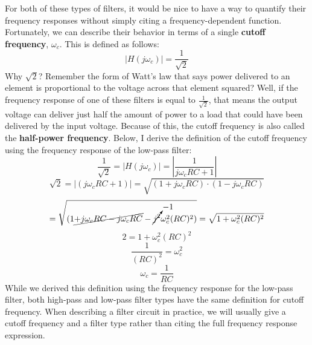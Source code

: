 \par
For both of these types of filters, it would be nice to have a way to quantify their frequency responses without simply citing a frequency-dependent function. Fortunately, we can describe their behavior in terms of a single \textbf{cutoff frequency}, $\omega_c$. This is defined as follows:
$$
|H(j\omega_c)| = \frac{1}{\sqrt{2}}
$$
Why $\sqrt{2}$? Remember the form of Watt's law that says power delivered to an element is proportional to the voltage across that element squared? Well, if the frequency response of one of these filters is equal to $\frac{1}{\sqrt{2}}$, that means the output voltage can deliver just half the amount of power to a load that could have been delivered by the input voltage. Because of this, the cutoff frequency is also called the \textbf{half-power frequency}. Below, I derive the definition of the cutoff frequency using the frequency response of the low-pass filter:
$$
\frac{1}{\sqrt{2}} = |H(j\omega_c)| = \left|\frac{1}{j\omega_c RC +1}\right|
$$
$$
\sqrt{2} = |(j\omega_c RC +1)| = \sqrt{(1 + j\omega_c RC)\cdot(1 - j\omega_c RC)}
$$
$$
= \sqrt{(1 \cancel{+ j\omega_c RC - j\omega_c RC} - \cancelto{-1}{j^2}\omega_c^2(RC)^2)} = \sqrt{1+ \omega_c^2 (RC)^2}
$$
$$
2 = 1+\omega_c^2(RC)^2
$$
$$
\frac{1}{(RC)^2}=\omega_c^2
$$
$$
\omega_c=\frac{1}{RC}
$$
While we derived this definition using the frequency response for the low-pass filter, both high-pass and low-pass filter types have the same definition for cutoff frequency. When describing a filter circuit in practice, we will usually give a cutoff frequency and a filter type rather than citing the full frequency response expression.



